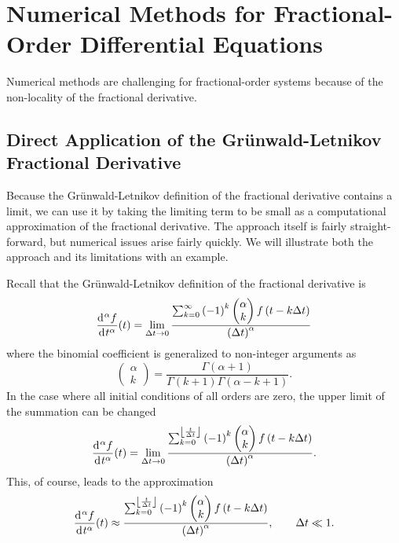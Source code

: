 \chapter[Numerical Methods]{Numerical Methods for Fractional-Order Differential Equations}

Numerical methods are challenging for fractional-order systems because of the non-locality of the fractional derivative. 

\section{Direct Application of the Gr\"unwald-Letnikov Fractional Derivative}

Because the Gr\"unwald-Letnikov definition of the fractional derivative contains a limit, we can use it by taking the limiting term to be small as a computational approximation of the fractional derivative. The approach itself is fairly straight-forward, but numerical issues arise fairly quickly. We will illustrate both the approach and its limitations with an example.

Recall that the Gr\"unwald-Letnikov definition of the fractional derivative is
\begin{equation*}
  \frac{\operatorname{d}\hspace*{-1pt}^\alpha f}{\operatorname{d}\hspace*{-1pt} t^\alpha}(t) = \lim_{\Delta t \rightarrow 0} \frac{\sum_{k=0}^{\infty}\left(-1\right)^k \begin{pmatrix} \alpha \\ k \end{pmatrix} f \left( t - k \Delta t \right) }{\left( \Delta t \right)^\alpha}
\end{equation*}
where the binomial coefficient is generalized to non-integer arguments as
\begin{equation*}
  \begin{pmatrix} \alpha \\ k \end{pmatrix} = \frac{\Gamma \left( \alpha + 1 \right)}{\Gamma \left( k + 1 \right) \Gamma \left( \alpha - k + 1 \right)}.
\end{equation*}
In the case where all initial conditions of all orders are zero, the upper limit of the summation can be changed
\begin{equation*}
  \frac{\operatorname{d}\hspace*{-1pt}^\alpha f}{\operatorname{d}\hspace*{-1pt} t^\alpha}(t) = \lim_{\Delta t \rightarrow 0} \frac{\sum_{k=0}^{\left\lfloor \frac{t}{\Delta t} \right\rfloor}\left(-1\right)^k \begin{pmatrix} \alpha \\ k \end{pmatrix} f \left( t - k \Delta t \right) }{\left( \Delta t \right)^\alpha}.
\end{equation*}
This, of course, leads to the approximation
\begin{equation*}
  \frac{\operatorname{d}\hspace*{-1pt}^\alpha f}{\operatorname{d}\hspace*{-1pt} t^\alpha}(t) \approx \frac{\sum_{k=0}^{\left\lfloor \frac{t}{\Delta t} \right\rfloor}\left(-1\right)^k \begin{pmatrix} \alpha \\ k \end{pmatrix} f \left( t - k \Delta t \right) }{\left( \Delta t \right)^\alpha}, \qquad \Delta t \ll 1.
\end{equation*}

